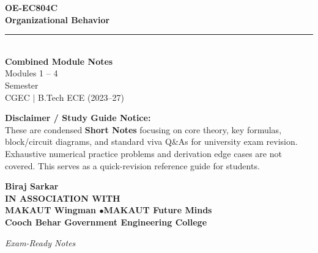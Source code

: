 \documentclass[12pt,a4paper]{article}
\begin{document}
\thispagestyle{empty}


\vspace*{1.0cm}
\begin{center}
  {\Huge\bfseries\color{myred} OE-EC804C}\\[10pt]
  {\LARGE\bfseries\color{mydark} Organizational Behavior}\\[20pt]
  {\color{myred}\rule{0.7\linewidth}{1.5pt}}\\[18pt]
  {\Large\color{myteal}\textbf{Combined Module Notes}}\\[8pt]
  {\large\color{mydark} Modules 1 -- 4}\\[40pt]
  {\normalsize\color{mydark} Semester}\\[12pt]
  {\normalsize\color{mydark} CGEC \;$|$\; B.Tech ECE (2023--27)}
\end{center}
\vspace{1.0cm}
\begin{center}
  \begin{tcolorbox}[colback=mygray, colframe=mgframe, boxrule=0.5pt, arc=3pt, width=0.85\linewidth]
    \centering\small\color{mydark}
    \textbf{Disclaimer / Study Guide Notice:}\\
    These are condensed \textbf{Short Notes} focusing on core theory, key formulas, block/circuit diagrams, and standard viva Q\&As for university exam revision. Exhaustive numerical practice problems and derivation edge cases are not covered. This serves as a quick-revision reference guide for students.
  \end{tcolorbox}
\end{center}
\vfill
\vspace{0.6cm}
\begin{center}
  {\large\bfseries\color{mypurple} Biraj Sarkar}\\[16pt]
  {\footnotesize\color{watermark}\textbf{IN ASSOCIATION WITH}}\\[8pt]
  {\small\bfseries\color{mydark} MAKAUT Wingman \quad$\bullet$\quad MAKAUT Future Minds}\\[12pt]
  {\large\bfseries\color{myteal} Cooch Behar Government Engineering College}
\end{center}
\vfill
\begin{center}{\small\color{watermark}\textit{Exam-Ready Notes}}\end{center}
\clearpage
\end{document}
